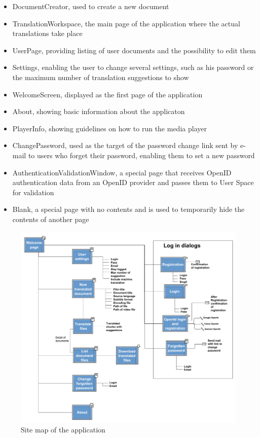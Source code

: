 \begin{itemize}
\item DocumentCreator, used to create a new document
\item TranslationWorkspace, the main page of the application where the actual translations take place
\item UserPage, providing listing of user documents and the possibility to edit them
\item Settings, enabling the user to change several settings, such as his password or the maximum number of translation suggestions to show
\item WelcomeScreen, displayed as the first page of the application
\item About, showing basic information about the applicaton
\item PlayerInfo, showing guidelines on how to run the media player
\item ChangePassword, used as the target of the password change link sent by e-mail to users who forget their password, enabling them to set a new password
\item AuthenticationValidationWindow, a special page that receives OpenID authentication data from an OpenID provider and passes them to User Space for validation
\item Blank, a special page with no contents and is used to temporarily hide the contents of another page
\end{itemize}

\begin{figure}
\begin{center}
\includegraphics[scale=0.4]{figures/sitemap.pdf}
\end{center}
\caption{Site map of the application}
\label{fig:sitemap}
\end{figure}

